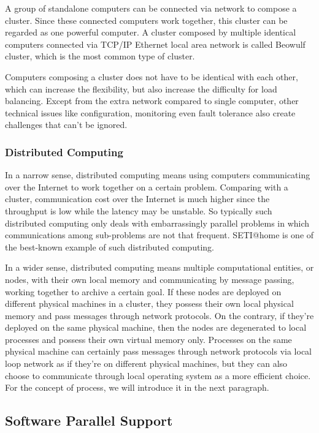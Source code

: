 \documentclass[12pt,a4paper]{report}
\begin{document}
A group of standalone computers can be connected via network to compose a cluster. Since these connected computers work together, this cluster can be regarded as one powerful computer. A cluster composed by multiple identical computers connected via TCP/IP Ethernet local area network is called Beowulf cluster, which is the most common type of cluster.

Computers composing a cluster does not have to be identical with each other, which can increase the flexibility, but also increase the difficulty for load balancing. Except from the extra network compared to single computer, other technical issues like configuration, monitoring even fault tolerance also create challenges that can't be ignored.

\subsubsection{Distributed Computing}

In a narrow sense, distributed computing means using computers communicating over the Internet to work together on a certain problem. Comparing with a cluster, communication cost over the Internet is much higher since the throughput is low while the latency may be unstable. So typically such distributed computing only deals with embarrassingly parallel problems in which communications among sub-problems are not that frequent. SETI@home is one of the best-known example of such distributed computing.

In a wider sense, distributed computing means multiple computational entities, or nodes, with their own local memory and communicating by message passing, working together to archive a certain goal. If these nodes are deployed on different physical machines in a cluster, they possess their own local physical memory and pass messages through network protocols. On the contrary, if they're deployed on the same physical machine, then the nodes are degenerated to local processes and possess their own virtual memory only. Processes on the same physical machine can certainly pass messages through network protocols via local loop network as if they're on different physical machines, but they can also choose to communicate through local operating system as a more efficient choice. For the concept of process, we will introduce it in the next paragraph.

\subsection{Software Parallel Support}
\end{document}
